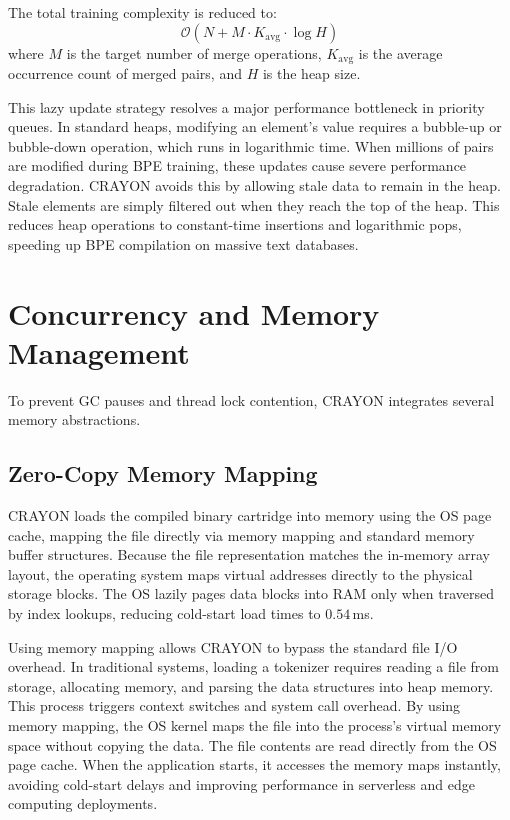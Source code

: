 \documentclass[10pt,journal,compsoc]{IEEEtran}
\begin{document}
The total training complexity is reduced to:
\begin{equation}
\mathcal{O}(N + M \cdot K_{\text{avg}} \cdot \log H)
\end{equation}
where $M$ is the target number of merge operations, $K_{\text{avg}}$ is the average occurrence count of merged pairs, and $H$ is the heap size.

This lazy update strategy resolves a major performance bottleneck in priority queues. In standard heaps, modifying an element's value requires a bubble-up or bubble-down operation, which runs in logarithmic time. When millions of pairs are modified during BPE training, these updates cause severe performance degradation. CRAYON avoids this by allowing stale data to remain in the heap. Stale elements are simply filtered out when they reach the top of the heap. This reduces heap operations to constant-time insertions and logarithmic pops, speeding up BPE compilation on massive text databases.

\section{Concurrency and Memory Management}
To prevent GC pauses and thread lock contention, CRAYON integrates several memory abstractions.

\subsection{Zero-Copy Memory Mapping}
CRAYON loads the compiled binary cartridge into memory using the OS page cache, mapping the file directly via memory mapping and standard memory buffer structures.
Because the file representation matches the in-memory array layout, the operating system maps virtual addresses directly to the physical storage blocks. The OS lazily pages data blocks into RAM only when traversed by index lookups, reducing cold-start load times to $0.54$\,ms.

Using memory mapping allows CRAYON to bypass the standard file I/O overhead. In traditional systems, loading a tokenizer requires reading a file from storage, allocating memory, and parsing the data structures into heap memory. This process triggers context switches and system call overhead. By using memory mapping, the OS kernel maps the file into the process's virtual memory space without copying the data. The file contents are read directly from the OS page cache. When the application starts, it accesses the memory maps instantly, avoiding cold-start delays and improving performance in serverless and edge computing deployments.
\end{document}
